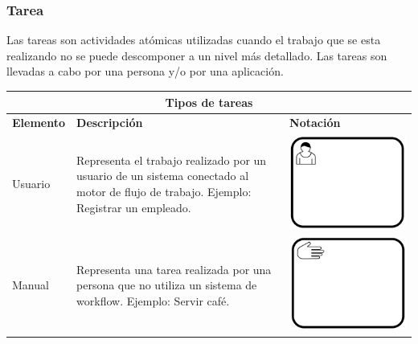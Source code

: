 \subsubsection{Tarea}
Las tareas son actividades atómicas utilizadas cuando el trabajo que se esta realizando no se puede descomponer a un nivel más detallado. Las tareas son llevadas a cabo por una persona y/o por una aplicación.

\begin{table}[H]
	\centering
	\begin{tabular}{|p{2cm}|p{9.5cm}|p{1.7cm} |}
	\hline
	\multicolumn{3}{|c|}{Tipos de tareas} \\
	\hline
	\textbf{Elemento}& \textbf{Descripción}&\textbf{Notación}\\
	\hline
	{\small Usuario } & {\small Representa el trabajo realizado por un usuario de un sistema conectado al motor de flujo de trabajo. Ejemplo: Registrar un empleado.} & \vspace{0.5mm} \hspace{2mm} \includegraphics[scale=0.1]{Capitulo2/imagenes/TUsuario} \\
	
	\hline
	{\small Manual } & {\small Representa una tarea realizada por una persona que no utiliza un sistema de workflow. Ejemplo: Servir café.} & \vspace{0.5mm} \hspace{2mm} \includegraphics[scale=0.1]{Capitulo2/imagenes/TManual} \\
	

\end{tabular}
\end{table}
